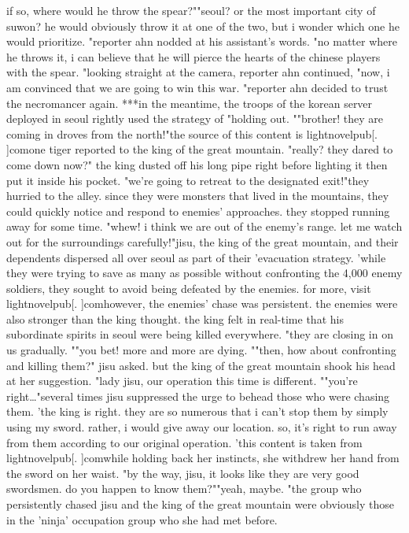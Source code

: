 if so, where would he throw the spear?""seoul? or the most important city of suwon? he would obviously throw it at one of the two, but i wonder which one he would prioritize.
"reporter ahn nodded at his assistant's words.
 "no matter where he throws it, i can believe that he will pierce the hearts of the chinese players with the spear.
"looking straight at the camera, reporter ahn continued, "now, i am convinced that we are going to win this war.
"reporter ahn decided to trust the necromancer again.
***in the meantime, the troops of the korean server deployed in seoul rightly used the strategy of "holding out.
""brother! they are coming in droves from the north!"the source of this content is lightnovelpub[.
]comone tiger reported to the king of the great mountain.
 "really? they dared to come down now?"
the king dusted off his long pipe right before lighting it then put it inside his pocket.
"we're going to retreat to the designated exit!"they hurried to the alley.
 since they were monsters that lived in the mountains, they could quickly notice and respond to enemies' approaches.
they stopped running away for some time.
 "whew! i think we are out of the enemy's range.
 let me watch out for the surroundings carefully!"jisu, the king of the great mountain, and their dependents dispersed all over seoul as part of their 'evacuation strategy.
'while they were trying to save as many as possible without confronting the 4,000 enemy soldiers, they sought to avoid being defeated by the enemies.
 for more, visit lightnovelpub[.
]comhowever, the enemies' chase was persistent.
 the enemies were also stronger than the king thought.
 the king felt in real-time that his subordinate spirits in seoul were being killed everywhere.
"they are closing in on us gradually.
""you bet! more and more are dying.
""then, how about confronting and killing them?" jisu asked.
 but the king of the great mountain shook his head at her suggestion.
"lady jisu, our operation this time is different.
""you're right…"several times jisu suppressed the urge to behead those who were chasing them.
'the king is right.
 they are so numerous that i can't stop them by simply using my sword.
 rather, i would give away our location.
 so, it's right to run away from them according to our original operation.
'this content is taken from lightnovelpub[.
]comwhile holding back her instincts, she withdrew her hand from the sword on her waist.
"by the way, jisu, it looks like they are very good swordsmen.
 do you happen to know them?""yeah, maybe.
"the group who persistently chased jisu and the king of the great mountain were obviously those in the 'ninja' occupation group who she had met before.
